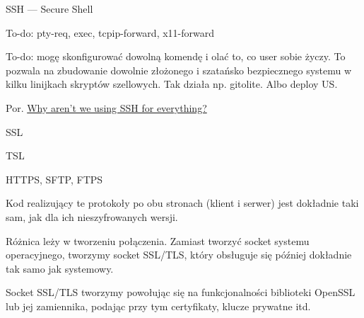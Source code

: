 \begin{frame}{SSH --- Secure Shell}
	
	To-do: pty-req, exec, tcpip-forward, x11-forward
	
	To-do: mogę skonfigurować dowolną komendę i olać to, co user sobie życzy. To pozwala na zbudowanie dowolnie złożonego i szatańsko bezpiecznego systemu w kilku linijkach skryptów szellowych. Tak działa np. gitolite. Albo deploy US.
	
	Por. \href{https://medium.com/@shazow/ssh-how-does-it-even-9e43586e4ffc}{Why aren’t we using SSH for everything?}
	
\end{frame}

\begin{frame}{SSL}
	
\end{frame}

\begin{frame}{TSL}
	
\end{frame}

\begin{frame}{HTTPS, SFTP, FTPS}
	
	Kod realizujący te protokoły po obu stronach (klient i serwer) jest dokładnie taki sam, jak dla ich nieszyfrowanych wersji.
	
	Różnica leży w tworzeniu połączenia. Zamiast tworzyć socket systemu operacyjnego, tworzymy socket SSL/TLS, który obsługuje się później dokładnie tak samo jak systemowy.
	
	Socket SSL/TLS tworzymy powołując się na funkcjonalności biblioteki OpenSSL lub jej zamiennika, podając przy tym certyfikaty, klucze prywatne itd.
	
\end{frame}

